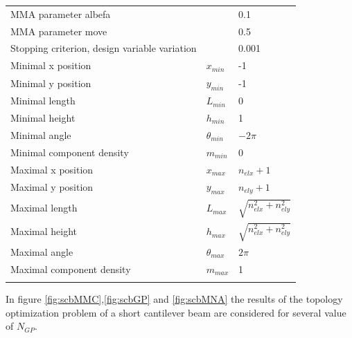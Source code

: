 \begin{table}[h!]
\begin{tabular}{lll}
MMA parameter albefa & & 0.1\\
MMA parameter move & & 0.5\\
Stopping criterion, design variable variation & & 0.001\\
Minimal x position & $x_{min}$ & -1\\
Minimal y position & $y_{min}$ & -1\\
Minimal length& $L_{min}$ & 0\\
Minimal height & $h_{min}$ & 1\\
Minimal angle & $\theta_{min}$ & $-2\pi$\\
Minimal component density & $m_{min}$ & 0\\
Maximal x position & $x_{max}$ & $n_{elx}+1$\\
Maximal y position & $y_{max}$ & $n_{ely}+1$\\
Maximal length& $L_{max}$ & $\sqrt{n_{elx}^2+n_{ely}^2}$\\
Maximal height & $h_{max}$ & $\sqrt{n_{elx}^2+n_{ely}^2}$\\
Maximal angle & $\theta_{max}$ & $2\pi$\\
Maximal component density & $m_{max}$ & 1\\
\noalign{\smallskip}\hline
\end{tabular}
\end{table}
 In figure \ref{fig:scbMMC},\ref{fig:scbGP} and \ref{fig:scbMNA} the results of the topology optimization problem of a short cantilever beam are considered for several value of $N_{GP}$.
\clearpage
